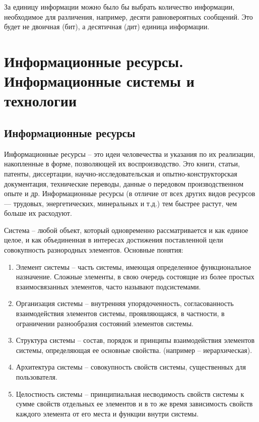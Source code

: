 \documentclass[a4paper]{article}
\begin{document}
За единицу информации можно было бы выбрать количество информации, необходимое для различения, например, десяти равновероятных сообщений. Это будет не двоичная (бит), а десятичная (дит) единица информации.

\section{Информационные ресурсы. Информационные системы и технологии}

\subsection{Информационные ресурсы}

Информационные ресурсы – это идеи человечества и указания по их реализации, накопленные в форме, позволяющей их воспроизводство. Это книги, статьи, патенты, диссертации, научно-исследовательская и опытно-конструкторская документация, технические переводы, данные о передовом производственном опыте и др. Информационные ресурсы (в отличие от всех других видов ресурсов — трудовых, энергетических, минеральных и т.д.) тем быстрее растут, чем больше их расходуют.

Система – любой объект, который одновременно рассматривается и как единое целое, и как объединенная в интересах достижения поставленной цели совокупность разнородных элементов.
Основные понятия:
\begin{enumerate}
\item Элемент системы – часть системы, имеющая определенное функциональное назначение. Сложные элементы, в свою очередь состоящие из более простых взаимосвязанных элементов, часто называют подсистемами.
\item  Организация системы – внутренняя упорядоченность, согласованность взаимодействия элементов системы, проявляющаяся, в частности, в ограничении разнообразия состояний элементов системы.
\item Структура системы – состав, порядок и принципы взаимодействия элементов системы, определяющая ее основные свойства. (например – иерархическая).
\item Архитектура системы – совокупность свойств системы, существенных для пользователя.
\item Целостность системы – принципиальная несводимость свойств системы к сумме свойств отдельных ее элементов и в то же время зависимость свойств каждого элемента от его места и функции внутри системы.
\end{enumerate}
\end{document}
